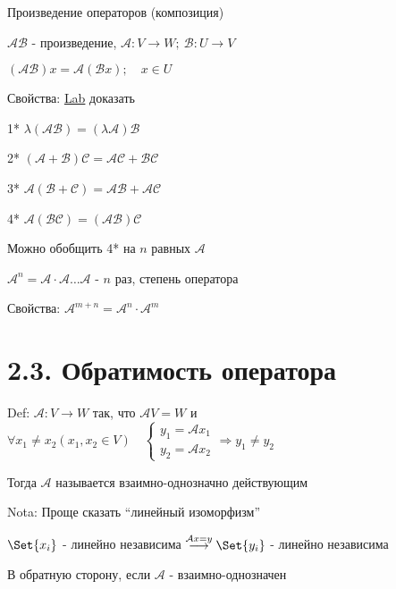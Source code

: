 \documentclass[12pt]{article}
\begin{document}
    \Def Произведение операторов (композиция)

    $\mathcal{A}\mathcal{B}$ - произведение, $\mathcal{A} : V \rightarrow W; \ \mathcal{B} : U \rightarrow V$

    $(\mathcal{A}\mathcal{B}) x = \mathcal{A}(\mathcal{B}x); \quad x \in U$

    Свойства: \underline{Lab} доказать

    1* $\lambda (\mathcal{A}\mathcal{B}) = (\lambda \mathcal{A})\mathcal{B}$

    2* $(\mathcal{A} + \mathcal{B}) \mathcal{C} = \mathcal{A}\mathcal{C} + \mathcal{B}\mathcal{C}$

    3* $\mathcal{A} (\mathcal{B} + \mathcal{C}) = \mathcal{A}\mathcal{B} + \mathcal{A}\mathcal{C}$

    4* $\mathcal{A} (\mathcal{B}\mathcal{C}) = (\mathcal{A}\mathcal{B}) \mathcal{C}$


    \Nota Можно обобщить 4* на $n$ равных $\mathcal{A}$

    \Def $\displaystyle \mathcal{A}^n = \mathcal{A} \cdot \mathcal{A} \dots \mathcal{A}$ - $n$ раз, степень оператора

    Свойства: $\displaystyle \mathcal{A}^{m + n} = \mathcal{A}^n \cdot \mathcal{A}^m$

    \section[p2\_3]{2.3. Обратимость оператора}

    Def: $\mathcal{A} : V \rightarrow W$ так, что $\mathcal{A}V = W$ и $\displaystyle \forall x_1 \neq x_2 (x_1, x_2 \in V) \quad
    \begin{cases}y_1 = \mathcal{A}x_1 \\ y_2 = \mathcal{A}x_2\end{cases} \Longrightarrow y_1 \neq y_2$

    Тогда $\mathcal{A}$ называется взаимно-однозначно действующим

    Nota: Проще сказать \enquote{линейный изоморфизм}

    \Th $\displaystyle \Set{x_i}$ - линейно независима $\displaystyle \stackrel{\mathcal{A}x = y}{\longrightarrow} \Set{y_i}$ - линейно независима

    В обратную сторону, если $\mathcal{A}$ - взаимно-однозначен
\end{document}
